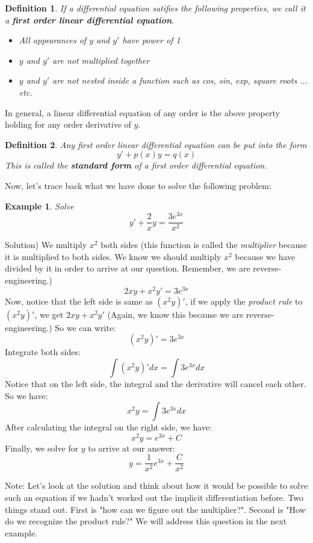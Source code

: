 \documentclass[12pt]{report}
\newtheorem{ex}{Example}[section]
\newtheorem{df}{Definition}[section]
\begin{document}
\begin{df}
If a differential equation satifies the following properties, we call it a \textbf{first order linear differential equation}.
\begin{itemize}
\item All appearances of $y$ and $y'$ have power of 1  
\item $y$ and $y'$ are not multiplied together 
\item $y$ and $y'$ are not nested inside a function such as cos, sin, exp, square roots ... etc.
\end{itemize}
\end{df}

In general, a linear differential equation of any order is the above property holding for any order derivative of $y$.

\begin{df}
Any first order linear differential equation can be put into the form
$$y'+p(x) y = q(x)$$
This is called the \textbf{standard form} of a first order differential equation.
\end{df}

Now, let's trace back what we have done to solve the following problem:
\begin{ex} Solve
$$  y'+ \frac{2}{x} y = \frac{3 e^{3x}}{x^2} $$
\end{ex}
Solution) We multiply $x^2$ both sides (this function is called the \textit{multiplier} because it is multiplied to both sides. We know we should multiply $x^2$ because we have divided by it in order to arrive at our question. Remember, we are reverse-engineering.)
$$ 2xy + x^2 y'= 3 e^{3x} $$
Now, notice that the left side is same as $\left( x^2 y \right)'$, if we apply the \textit{product rule} to $\left( x^2 y \right)'$, we get $ 2xy + x^2 y'$  (Again, we know this because we are reverse-engineering.) So we can write:
$$ \left( x^2 y \right)'= 3 e^{3x} $$
Integrate both sides:
$$ \int \left( x^2 y \right)' dx = \int 3 e^{3x} dx $$
Notice that on the left side, the integral and the derivative will cancel each other. So we have:
$$ x^2 y  = \int 3 e^{3x} dx $$
After calculating the integral on the right side, we have:
$$ x^2 y  =  e^{3x} + C $$
Finally, we solve for $y$ to arrive at our answer:
$$ y  =  \frac{1}{x^2} e^{3x} + \frac{C}{x^2}  $$

Note: Let's look at the solution and think about how it would be possible to solve such an equation if we hadn't worked out the implicit differentiation before. Two things stand out. First is "how can we figure out the multiplier?". Second is "How do we recognize the product rule?" We will address this question in the next example.
\end{document}
